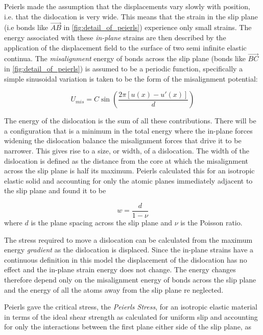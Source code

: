 Peierls made the assumption that the displacements vary slowly with position, i.e. that the dislocation is very wide. This means that the strain in the slip plane (i.e bonds like $\overrightarrow{AB}$ in \autoref{fig:detail_of_peierls}) experience only small strains. The energy associated with these \emph{in-plane} strains are then described  by the application of the displacement field to the surface of two semi infinite elastic continua. 
The \emph{misalignment} energy of bonds across the slip plane (bonds like $\overrightarrow{BC}$ in \autoref{fig:detail_of_peierls}) is assumed to be a periodic function, specifically a simple sinusoidal variation is taken to be the form of the misalignment potential:

\begin{equation}
U_{mis} = C \sin \left(\frac{2\pi [u(x) - u'(x)]}{d} \right)
\end{equation}


The energy of the dislocation is the sum of all these contributions. There will be a configuration that is a minimum in the total energy where the in-plane forces widening the dislocation balance the misalignment forces that drive it to be narrower. This gives rise to a size, or width, of a dislocation. The width of the dislocation is defined as the distance from the core at which the misalignment across the slip plane is half its maximum. Peierls calculated this for an isotropic elastic solid and accounting for only the atomic planes immediately adjacent to the slip plane and found it to be 

\begin{equation}
w = \frac{d}{1-\nu}
\label{eqn:width_isotropic}
\end{equation}
where $d$ is the plane spacing across the slip plane and $\nu$ is the Poisson ratio.

The stress required to move a dislocation can be calculated from the maximum energy \emph{gradient} as the dislocation is displaced. Since the in-plane strains have a continuous definition in this model the displacement of the dislocation has no effect and the in-plane strain energy does not change. The energy changes therefore depend only on the misalignment energy of bonds across the slip plane and the energy of all the atoms away from the slip plane re neglected.

Peierls gave the critical stress, the \emph{Peierls Stress}, for an isotropic elastic material in terms of the ideal shear strength as calculated for uniform slip and accounting for only the interactions between the first plane either side of the slip plane, as


